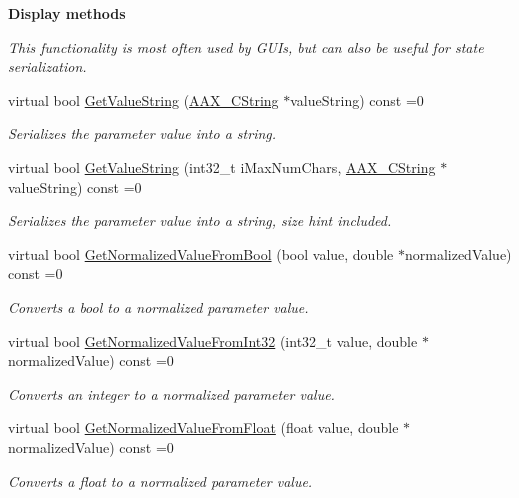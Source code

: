 \begin{Indent}\textbf{ Display methods}\par
{\em This functionality is most often used by G\+U\+Is, but can also be useful for state serialization. }\begin{DoxyCompactItemize}
\item 
virtual bool \mbox{\hyperlink{a01857_a0b20c4210f4bb6e6f00de8817051dfb8}{Get\+Value\+String}} (\mbox{\hyperlink{a01573}{A\+A\+X\+\_\+\+C\+String}} $\ast$value\+String) const =0
\begin{DoxyCompactList}\small\item\em Serializes the parameter value into a string. \end{DoxyCompactList}\item 
virtual bool \mbox{\hyperlink{a01857_a563ff5b1730d926c57f1d2420cc1aca0}{Get\+Value\+String}} (int32\+\_\+t i\+Max\+Num\+Chars, \mbox{\hyperlink{a01573}{A\+A\+X\+\_\+\+C\+String}} $\ast$value\+String) const =0
\begin{DoxyCompactList}\small\item\em Serializes the parameter value into a string, size hint included. \end{DoxyCompactList}\item 
virtual bool \mbox{\hyperlink{a01857_a10583b56f9c1c51e99a5b3413e3ed359}{Get\+Normalized\+Value\+From\+Bool}} (bool value, double $\ast$normalized\+Value) const =0
\begin{DoxyCompactList}\small\item\em Converts a bool to a normalized parameter value. \end{DoxyCompactList}\item 
virtual bool \mbox{\hyperlink{a01857_aaf7408ff1823e27534452593230e5437}{Get\+Normalized\+Value\+From\+Int32}} (int32\+\_\+t value, double $\ast$normalized\+Value) const =0
\begin{DoxyCompactList}\small\item\em Converts an integer to a normalized parameter value. \end{DoxyCompactList}\item 
virtual bool \mbox{\hyperlink{a01857_af4f7271d7c3b016235a81b6324bdb328}{Get\+Normalized\+Value\+From\+Float}} (float value, double $\ast$normalized\+Value) const =0
\begin{DoxyCompactList}\small\item\em Converts a float to a normalized parameter value. \end{DoxyCompactList}\item 

\end{DoxyCompactItemize}
\end{Indent}
